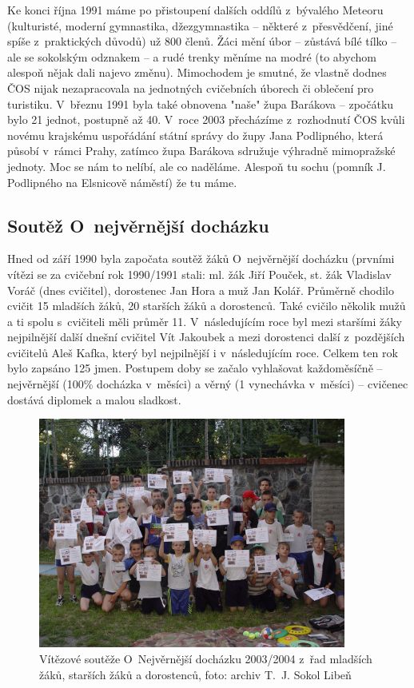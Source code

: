 \documentclass[a5paper, 11pt, twoside]{article}
\begin{document}
Ke konci října 1991 máme po přistoupení dalších oddílů z~bývalého
Meteoru (kulturisté, moderní gymnastika, džezgymnastika -- některé
z~přesvědčení, jiné spíše z~praktických důvodů) už 800 členů. Žáci mění
úbor -- zůstává bílé tílko -- ale se sokolským odznakem -- a rudé trenky
měníme na modré (to abychom alespoň nějak dali najevo změnu). Mimochodem
je smutné, že vlastně dodnes ČOS nijak nezapracovala na jednotných
cvičebních úborech či oblečení pro turistiku. V~březnu 1991 byla také
obnovena "naše" župa Barákova -- zpočátku bylo 21 jednot, postupně až
40. V~roce 2003 přecházíme z~rozhodnutí ČOS kvůli novému krajskému
uspořádání státní správy do župy Jana Podlipného, která působí v~rámci
Prahy, zatímco župa Barákova sdružuje výhradně mimopražské jednoty. Moc
se nám to nelíbí, ale co naděláme. Alespoň tu sochu (pomník J.
Podlipného na Elsnicově náměstí) že tu máme.

\subsection{Soutěž O~nejvěrnější
docházku}

Hned od září 1990 byla započata soutěž žáků O~nejvěrnější docházku
(prvními vítězi se za cvičební rok 1990/1991 stali: ml. žák Jiří Pouček,
st. žák Vladislav Voráč (dnes cvičitel), dorostenec Jan Hora a muž Jan
Kolář. Průměrně chodilo cvičit 15 mladších žáků, 20 starších žáků a
dorostenců. Také cvičilo několik mužů a ti spolu s~cvičiteli měli průměr
11. V~následujícím roce byl mezi staršími žáky nejpilnější další dnešní
cvičitel Vít Jakoubek a mezi dorostenci další z~pozdějších cvičitelů
Aleš Kafka, který byl nejpilnější i v~následujícím roce. Celkem ten rok
bylo zapsáno 125 jmen. Postupem doby se začalo vyhlašovat každoměsíčně
-- nejvěrnější (100\% docházka v~měsíci) a věrný (1 vynechávka v~měsíci)
-- cvičenec dostává diplomek a malou sladkost.

\begin{figure}[h!]
  \centering 
  \includegraphics[width=0.9\textwidth]{img/37_vitezove_dochazka.JPG}
  \caption*{Vítězové soutěže O~Nejvěrnější docházku 2003/2004 z~řad mladších
  žáků, starších žáků a dorostenců, foto: archiv T.~J. Sokol Libeň}
\end{figure}
\end{document}
